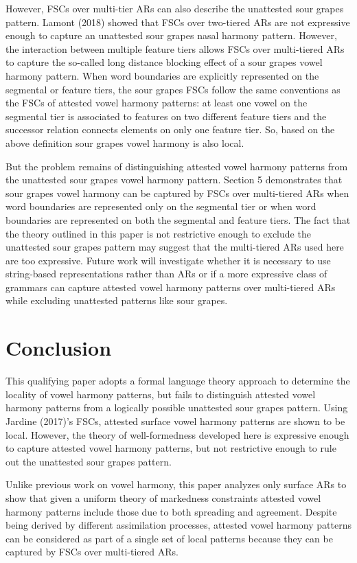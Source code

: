 \documentclass[,doc,floatsintext]{apa6}
\theoremstyle{definition}
\theoremstyle{definition}
\theoremstyle{definition}
\theoremstyle{remark}
\begin{document}
However, FSCs over multi-tier ARs can also describe the unattested sour
grapes pattern. Lamont (2018) showed that FSCs over two-tiered ARs are
not expressive enough to capture an unattested sour grapes nasal harmony
pattern. However, the interaction between multiple feature tiers allows
FSCs over multi-tiered ARs to capture the so-called long distance
blocking effect of a sour grapes vowel harmony pattern. When word
boundaries are explicitly represented on the segmental or feature tiers,
the sour grapes FSCs follow the same conventions as the FSCs of attested
vowel harmony patterns: at least one vowel on the segmental tier is
associated to features on two different feature tiers and the successor
relation connects elements on only one feature tier. So, based on the
above definition sour grapes vowel harmony is also local.

But the problem remains of distinguishing attested vowel harmony
patterns from the unattested sour grapes vowel harmony pattern. Section
5 demonstrates that sour grapes vowel harmony can be captured by FSCs
over multi-tiered ARs when word boundaries are represented only on the
segmental tier or when word boundaries are represented on both the
segmental and feature tiers. The fact that the theory outlined in this
paper is not restrictive enough to exclude the unattested sour grapes
pattern may suggest that the multi-tiered ARs used here are too
expressive. Future work will investigate whether it is necessary to use
string-based representations rather than ARs or if a more expressive
class of grammars can capture attested vowel harmony patterns over
multi-tiered ARs while excluding unattested patterns like sour grapes.

\section{Conclusion}\label{conclusion}

This qualifying paper adopts a formal language theory approach to
determine the locality of vowel harmony patterns, but fails to
distinguish attested vowel harmony patterns from a logically possible
unattested sour grapes pattern. Using Jardine (2017)'s FSCs, attested
surface vowel harmony patterns are shown to be local. However, the
theory of well-formedness developed here is expressive enough to capture
attested vowel harmony patterns, but not restrictive enough to rule out
the unattested sour grapes pattern.

Unlike previous work on vowel harmony, this paper analyzes only surface
ARs to show that given a uniform theory of markedness constraints
attested vowel harmony patterns include those due to both spreading and
agreement. Despite being derived by different assimilation processes,
attested vowel harmony patterns can be considered as part of a single
set of local patterns because they can be captured by FSCs over
multi-tiered ARs.
\end{document}
